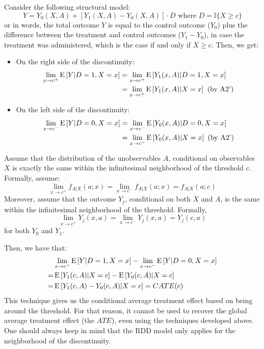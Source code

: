 Consider the following structural model: $$ Y = Y_0(X, A) + \left[Y_1(X, A) - Y_0(X, A)\right]\cdot D \text{ where } D = \mathbb{I}\{X \geq c\} $$ or in words, the total outcome $Y$ is equal to the control outcome ($Y_0$) plus the difference between the treatment and control outcomes ($Y_1 - Y_0$), in case the treatment was administered, which is the case if and only if $X\geq c$. Then, we get:\begin{itemize}
\item On the right side of the discontinuity: \begin{align*}
\lim_{x\to c^+} \operatorname{E}\left[Y\vert D=1, X=x\right] & = \lim_{x\to c^+} \operatorname{E}\left[Y_1(x, A)\vert D=1, X=x\right] \\ & = \lim_{x\to c^+} \operatorname{E}\left[Y_1(x, A)\vert X=x\right] \text{ (by A2')}
\end{align*}
\item On the left side of the discontinuity: \begin{align*}
\lim_{x\to c^-} \operatorname{E}\left[Y\vert D=0, X=x\right] & = \lim_{x\to c^-} \operatorname{E}\left[Y_0(x, A)\vert D=0, X=x\right] \\ & = \lim_{x\to c^-} \operatorname{E}\left[Y_0(x, A)\vert X=x\right] \text{ (by A2')}
\end{align*}
\end{itemize}

Assume that the distribution of the unobservables $A$, conditional on observables $X$ is exactly the same within the infinitesimal neighborhood of the threshold $c$. Formally, assume: $$\lim_{x\to c^+} f_{A\vert X}(a ;x) =  \lim_{x\to c^-} f_{A\vert X}(a ;x) = f_{A\vert X}(a ;c) $$ Moreover, assume that the outcome $Y_j$, conditional on both $X$ and $A$, is the same within the infinitesimal neighborhood of the threshold. Formally, $$\lim_{x\to c^+} Y_j(x, a) =  \lim_{x\to c^-} Y_j(x, a) = Y_j(c, a) $$ for both $Y_0$ and $Y_1$.

Then, we have that:\begin{align*}
& \lim_{x\to c^+} \operatorname{E}\left[Y\vert D=1, X=x\right] - \lim_{x\to c^-} \operatorname{E}\left[Y\vert D=0, X=x\right] \\ = & \operatorname{E}\left[Y_1(c, A)\vert X=c\right] - \operatorname{E}\left[Y_0(c, A)\vert X=c\right] \\ = & \operatorname{E}\left[Y_1(c, A) - Y_0(c, A)\vert X=c\right] = CATE(c)
\end{align*}
This technique gives us the conditional average treatment effect based on being around the threshold. For that reason, it cannot be used to recover the global average treatment effect (the $ATE$), even using the techniques developed above. One should always keep in mind that the RDD model only applies for the neighborhood of the discontinuity.

